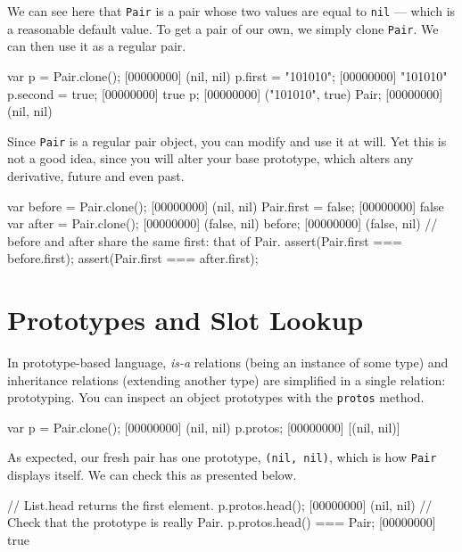 We can see here that \lstinline|Pair| is a pair whose two values are equal
to \lstinline|nil| --- which is a reasonable default value. To get a pair of
our own, we simply clone \lstinline|Pair|.  We can then use it as a regular
pair.

\begin{urbiscript}
var p = Pair.clone();
[00000000] (nil, nil)
p.first = "101010";
[00000000] "101010"
p.second = true;
[00000000] true
p;
[00000000] ("101010", true)
Pair;
[00000000] (nil, nil)
\end{urbiscript}

Since \lstinline|Pair| is a regular pair object, you can modify and use it
at will. Yet this is not a good idea, since you will alter your base
prototype, which alters any derivative, future and even past.

\begin{urbiscript}
var before = Pair.clone();
[00000000] (nil, nil)
Pair.first = false;
[00000000] false
var after = Pair.clone();
[00000000] (false, nil)
before;
[00000000] (false, nil)
// before and after share the same first: that of Pair.
assert(Pair.first === before.first);
assert(Pair.first === after.first);
\end{urbiscript}

\section{Prototypes and Slot Lookup}

In prototype-based language, \emph{is-a} relations (being an instance of
some type) and inheritance relations (extending another type) are simplified
in a single relation: prototyping. You can inspect an object prototypes with
the \lstinline{protos} method.

\begin{urbiscript}[firstnumber=1]
var p = Pair.clone();
[00000000] (nil, nil)
p.protos;
[00000000] [(nil, nil)]
\end{urbiscript}

As expected, our fresh pair has one prototype, \lstinline|(nil, nil)|, which
is how \lstinline|Pair| displays itself. We can check this as presented
below.

\begin{urbiscript}
// List.head returns the first element.
p.protos.head();
[00000000] (nil, nil)
// Check that the prototype is really Pair.
p.protos.head() === Pair;
[00000000] true
\end{urbiscript}

